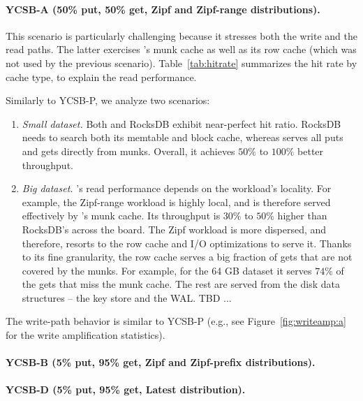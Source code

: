 \paragraph{YCSB-A (50\% put, 50\% get, Zipf and Zipf-range distributions).}

This scenario is particularly challenging because it stresses both the write and the read paths. 
The latter exercises \sys's munk cache as well as its row cache (which was not used by the previous 
scenario). Table~\ref{tab:hitrate} summarizes the hit rate by cache type, to explain the read performance. 

Similarly to YCSB-P, we analyze two scenarios: 

\begin{enumerate}
\item {\em Small dataset.} Both \sys\/ and RocksDB exhibit near-perfect hit ratio. RocksDB needs to search 
both its memtable and block cache, whereas \sys\/ serves all puts and gets directly from munks. Overall, it
achieves $50\%$ to $100\%$ better throughput.

\item {\em Big dataset.} \sys's read performance depends on the workload's locality. For example, 
the Zipf-range workload is highly local, and is therefore served effectively by \sys's munk cache. 
Its throughput is $30\%$ to $50\%$ higher than RocksDB's across the board. The Zipf workload
is more dispersed, and therefore, \sys\/ resorts to the row cache and I/O optimizations to serve it.  
Thanks to its fine granularity, the row cache serves a big fraction of gets that are not covered by the munks. 
For example, for the 64 GB dataset it serves $74\%$ of the gets that miss the munk cache. The rest are served 
from the disk data structures -- the key store and the WAL. TBD ... 

\end{enumerate}

The write-path behavior is similar to YCSB-P (e.g., see Figure~\ref{fig:writeamp:a} for the write
amplification statistics). 

\paragraph{YCSB-B (5\% put, 95\% get, Zipf and Zipf-prefix distributions).}


\paragraph{YCSB-D (5\% put, 95\% get, Latest distribution).}

